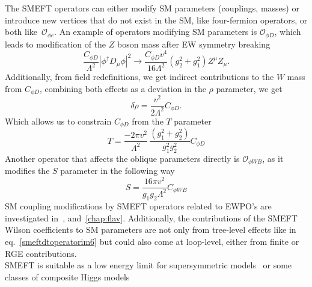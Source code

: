 The SMEFT operators can either modify SM parameters (couplings, masses) or introduce new vertices that do not exist in the SM, like four-fermion operators, or both like~$\mathcal{O}_{\phi e}$. An example of operators modifying SM parameters is $ \mathcal O_{\phi D}$, which leads to modification of the $Z$ boson mass after EW symmetry breaking 
\begin{equation}
\frac{C_{\phi D}}{\Lambda^2} | \phi^\dagger D_\mu \phi |^2 \to \frac{C_{\phi D} v^4}{16 \Lambda^2 } (g_2^2+g_1^2) Z^\mu Z_\mu.
	\label{smeftdtoperatorim6}
\end{equation}
Additionally, from field redefinitions, we get indirect contributions to the $W$ mass from $C_{\phi D}$, combining both effects as a deviation in the $\rho$ parameter, we get
\begin{equation}
\delta \rho = \frac{v^2}{2 \Lambda^2} C_{\phi D}.
	\label{rhosmeft}
\end{equation}
Which allows us to constrain $C_{\phi D}$ from the $T$ parameter 
\begin{equation}
	T = \frac{-2 \pi v^2}{\Lambda^2} \, \frac{(g_1^2 +g_2^2)}{g_1^2g_2^2} C_{\phi D}
	\label{smeftT}
\end{equation}
 Another operator that affects the oblique parameters directly is $\mathcal{O}_{\phi W B}$, as it modifies the $S$ parameter in the following way
\begin{equation}
S =\frac{16 \pi v^2}{g_1 g_2 \Lambda^2} C_{\phi W B}
	\label{smeftS}
\end{equation}
 SM coupling modifications by SMEFT operators related to EWPO's are investigated in~\cite{Alasfar:2020mne}, and~\autoref{chap:flav}. Additionally, the contributions of the SMEFT Wilson coefficients to SM parameters are not only from tree-level effects like in eq.~\eqref{smeftdtoperatorim6} but could also come at loop-level, either from finite or RGE contributions.\\
SMEFT is suitable as a low energy limit for supersymmetric models~\cite{CARENA200363} or some classes of composite Higgs models~\cite{Contino:2010rs,Panico:2015jxa}
